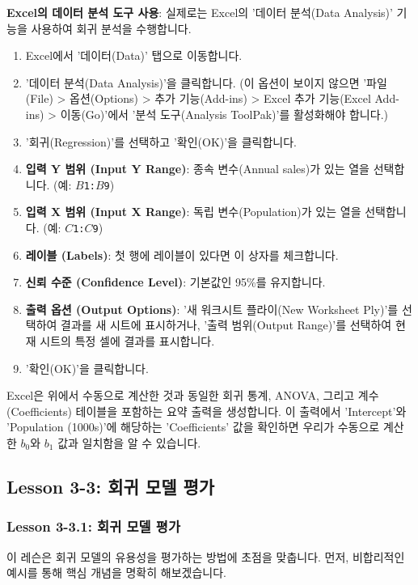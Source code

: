 \documentclass[11pt,a4paper]{article}
\theoremstyle{definition}
\begin{document}
\begin{tcolorbox}[examplebox, title=Excel 실습: 인구 및 매출 데이터]
\textbf{Excel의 데이터 분석 도구 사용}:
실제로는 Excel의 '데이터 분석(Data Analysis)' 기능을 사용하여 회귀 분석을 수행합니다.
\begin{enumerate}[label=\arabic*.]
    \item Excel에서 '데이터(Data)' 탭으로 이동합니다.
    \item '데이터 분석(Data Analysis)'을 클릭합니다. (이 옵션이 보이지 않으면 '파일(File) > 옵션(Options) > 추가 기능(Add-ins) > Excel 추가 기능(Excel Add-ins) > 이동(Go)'에서 '분석 도구(Analysis ToolPak)'를 활성화해야 합니다.)
    \item '회귀(Regression)'를 선택하고 '확인(OK)'을 클릭합니다.
    \item \textbf{입력 Y 범위 (Input Y Range)}: 종속 변수(Annual sales)가 있는 열을 선택합니다. (예: \texttt{$B$1:$B$9})
    \item \textbf{입력 X 범위 (Input X Range)}: 독립 변수(Population)가 있는 열을 선택합니다. (예: \texttt{$C$1:$C$9})
    \item \textbf{레이블 (Labels)}: 첫 행에 레이블이 있다면 이 상자를 체크합니다.
    \item \textbf{신뢰 수준 (Confidence Level)}: 기본값인 95\%를 유지합니다.
    \item \textbf{출력 옵션 (Output Options)}: '새 워크시트 플라이(New Worksheet Ply)'를 선택하여 결과를 새 시트에 표시하거나, '출력 범위(Output Range)'를 선택하여 현재 시트의 특정 셀에 결과를 표시합니다.
    \item '확인(OK)'을 클릭합니다.
\end{enumerate}
Excel은 위에서 수동으로 계산한 것과 동일한 회귀 통계, ANOVA, 그리고 계수(Coefficients) 테이블을 포함하는 요약 출력을 생성합니다. 이 출력에서 'Intercept'와 'Population (1000s)'에 해당하는 'Coefficients' 값을 확인하면 우리가 수동으로 계산한 $b_0$와 $b_1$ 값과 일치함을 알 수 있습니다.
\end{tcolorbox}

\newpage
\subsection{Lesson 3-3: 회귀 모델 평가}

\subsubsection{Lesson 3-3.1: 회귀 모델 평가}

이 레슨은 회귀 모델의 유용성을 평가하는 방법에 초점을 맞춥니다. 먼저, 비합리적인 예시를 통해 핵심 개념을 명확히 해보겠습니다.
\end{document}
